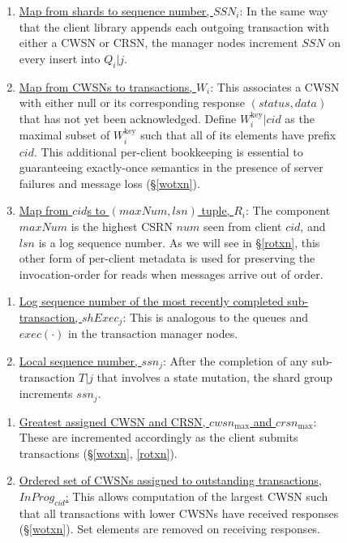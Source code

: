\documentclass{article}
\begin{document}
\begin{figure}[H]
\begin{tcolorbox}[title= On \textbf{transaction manager node} $i$, enhanced, width=1.05\textwidth, left skip=-0.5cm, colback=black!4!white]
\begin{enumerate}[itemsep=1pt]
\item \underline{Map from shards to sequence number, $SSN_i$}: In the same way that the client library appends each outgoing transaction with either a CWSN or CRSN, the manager nodes increment $SSN$ on every insert into $Q_i|j$. 
\item \underline{Map from CWSNs to transactions, $W_i$}: This associates a CWSN with either $\text{null}$ or its corresponding response $(status, data)$ that has not yet been acknowledged. Define $W_i^{\text{key}}|cid$ as the maximal subset of $W_i^{\text{key}}$ such that all of its elements have prefix $cid$. This additional per-client bookkeeping is essential to guaranteeing exactly-once semantics in the presence of server failures and message loss (\S \ref{wotxn}).
\item \underline{Map from $cid$s to $(maxNum, lsn)$ tuple, $R_i$}: The component $maxNum$ is the highest CSRN $num$ seen from client $cid$, and $lsn$ is a log sequence number. As we will see in \S \ref{rotxn}, this other form of per-client metadata is used for preserving the invocation-order for reads when messages arrive out of order. 
\end{enumerate}
\end{tcolorbox}
\begin{tcolorbox}[title= On \textbf{shard group} $j$, enhanced,width=1.05\textwidth, left skip=-0.5cm, colback=black!4!white]
\begin{enumerate}[itemsep=1pt]
\item \underline{Log sequence number of the most recently completed sub-transaction, $shExec_j$}: This is analogous to the queues and $exec(\cdot)$ in the transaction manager nodes. 
\item \underline{Local sequence number, $ssn_j$}: After the completion of any sub-transaction $T|j$ that involves a state mutation, the shard group increments $ssn_j$. 
\end{enumerate}
\end{tcolorbox}
\begin{tcolorbox}[title= On \textbf{client} $cid$, enhanced,width=1.05\textwidth, left skip=-0.5cm, colback=black!4!white]
  \begin{enumerate}[itemsep=1pt]
  \item \underline{Greatest assigned CWSN and CRSN, $cwsn_{\max}$ and $crsn_{\max}$}: These are incremented accordingly as the client submits transactions (\S \ref{wotxn}, \ref{rotxn}).
  \item \underline{Ordered set of CWSNs assigned to outstanding transactions, $InProg_{cid}$:} This allows computation of the largest CWSN such that all transactions with lower CWSNs have received responses (\S \ref{wotxn}). Set elements are removed on receiving responses. 

\end{enumerate}
\end{tcolorbox}
\end{figure}
\end{document}

